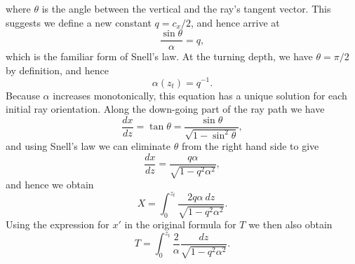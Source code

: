 \documentclass[a4paper,10pt]{paper}
\begin{document}
\begin{enumerate}
where $\theta$ is the angle between the vertical and the ray's tangent vector. This suggests we define a new constant $q=c_{x}/2$, and hence arrive at
\begin{equation*}
    \frac{\sin\theta}{\alpha}=q,
\end{equation*}
which is the familiar form of Snell's law. At the turning depth, we have $\theta=\pi/2$ by definition, and hence
\begin{equation*}
    \alpha(z_{t})=q^{-1}.
\end{equation*}
Because $\alpha$ increases monotonically, this equation has a unique solution for each initial ray orientation. Along the down-going part of the ray path we have
\begin{equation*}
    \frac{dx}{dz}=\tan\theta=\frac{\sin\theta}{\sqrt{1-\sin^{2}\theta}},
\end{equation*}
and using Snell's law we can eliminate $\theta$ from the right hand side to give
\begin{equation*}
    \frac{dx}{dz}=\frac{q\alpha}{\sqrt{1-q^{2}\alpha^{2}}},
\end{equation*}
and hence we obtain
\begin{equation*}
    X=\int_{0}^{z_{t}}\frac{2q\alpha~dz}{\sqrt{1-q^{2}\alpha^{2}}}.
\end{equation*}
Using the expression for $x'$ in the original formula for $T$ we then also obtain
\begin{equation*}
    T=\int_{0}^{z_{t}}\frac{2}{\alpha}\frac{dz}{\sqrt{1-q^{2}\alpha^{2}}}.
\end{equation*}

\end{enumerate}
\end{document}

